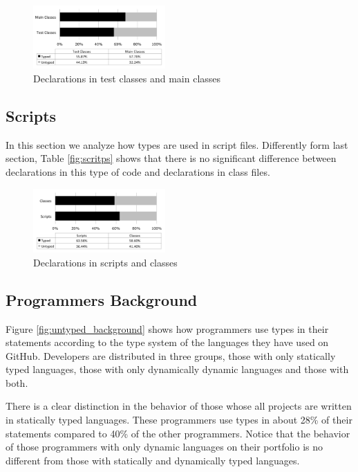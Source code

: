 \documentclass[preprint]{sigplanconf}
\begin{document}
\begin{figure}[ht]
\centering \includegraphics[width=0.45\textwidth]{images/test_classes} 
\caption{Declarations in test classes and main classes}
\label{fig:test_classes} 
\end{figure}

\subsection{Scripts\label{sub:scripts}}
In this section we analyze how types are used in script files.
Differently form last section, Table \ref{fig:scritps} shows that there is no significant difference between declarations in this type of code and declarations in class files.

\begin{figure}[ht]
\centering \includegraphics[width=0.45\textwidth]{images/scripts} 
\caption{Declarations in scripts and classes}
\label{fig:scripts} 
\end{figure}



\subsection{Programmers Background\label{sub:background}}

Figure \ref{fig:untyped_background} shows how programmers use types in their statements according to the type system of the languages they have used on GitHub.
Developers are distributed in three groups, those with only statically typed languages, those with only dynamically dynamic languages and those with both. 

There is a clear distinction in the behavior of those whose all projects are written in statically typed languages.
These programmers use types in about 28\% of their statements compared to 40\% of the other programmers.
Notice that the behavior of those programmers with only dynamic languages on their portfolio is no different from those with statically and dynamically typed languages.
\end{document}
